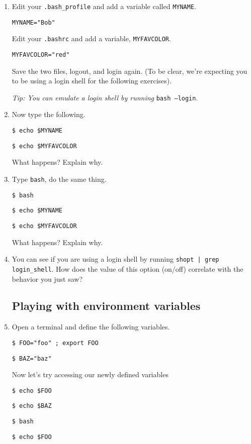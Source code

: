 \documentclass{article}
\begin{document}
\begin{enumerate}
	\item Edit your \texttt{.bash\_profile} and add a variable called \texttt{MYNAME}. 
		
		\texttt{MYNAME="Bob"}

		Edit your \texttt{.bashrc} and add a variable, \texttt{MYFAVCOLOR}.
		
		\texttt{MYFAVCOLOR="red"}
		
		Save the two files, logout, and login again. (To be clear, we're expecting you to be using a login shell for the following exercises).
		
		{\it Tip: You can emulate a login shell by running} \texttt{bash --login}.

	\item Now type the following.

		\texttt{\$ echo  \$MYNAME}
		
		\texttt{\$ echo \$MYFAVCOLOR} 

		What happens? Explain why.

	\item Type \texttt{bash}, do the same thing. 
		
		\texttt{\$ bash}

		\texttt{\$ echo \$MYNAME}

		\texttt{\$ echo \$MYFAVCOLOR}

		What happens? Explain why. 

\item You can see if you are using a login shell by running \texttt{shopt | grep login\_shell}. How does the value of this option (on/off) correlate with the behavior you just saw?

	\subsection{Playing with environment variables}
	\item Open a terminal and define the following variables. 

		\texttt{\$ FOO="foo" ; export FOO}

		\texttt{\$ BAZ="baz"}

		Now let's try accessing our newly defined variables
		
		\texttt{\$ echo \$FOO}

		\texttt{\$ echo \$BAZ}
		
		\texttt{\$ bash} 

		\texttt{\$ echo \$FOO}


\end{enumerate}
\end{document}
